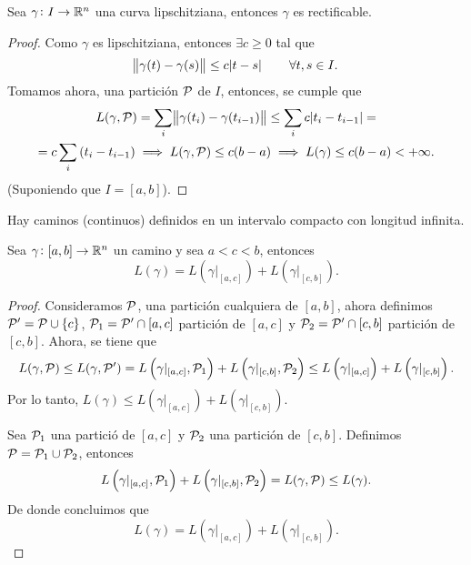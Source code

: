 \begin{prop}
    Sea $\gamma \colon I \to \mathbb{R}^n$ una curva lipschitziana, entonces $\gamma$ es rectificable.
\end{prop}

\begin{proof}
    Como $\gamma$ es lipschitziana, entonces $\exists c \geq 0$ tal que
    \[
        \norm{\gamma(t) - \gamma(s)} \leq c \abs{t - s} \qquad \forall t,s \in I.
    \]
    Tomamos ahora, una partición $\mathcal{P}$ de $I$, entonces, se cumple que
    \begin{gather*}
        L(\gamma, \mathcal{P}) = \sum_i \norm{\gamma(t_i) - \gamma(t_{i-1})} \leq \sum_i c \abs{t_i - t_{i-1}} = \\
        = c \sum_i \left( t_i - t_{i-1} \right) \implies L(\gamma, \mathcal{P}) \leq c (b - a) \implies
        L(\gamma) \leq c(b-a) < +\infty.
    \end{gather*}
    (Suponiendo que $I = [a, b]$).
\end{proof}

\begin{obs}
    Hay caminos (continuos) definidos en un intervalo compacto con longitud infinita.
\end{obs}

\begin{prop}
    Sea $\gamma \colon [a, b] \to \mathbb{R}^n$ un camino y sea $a < c < b$, entonces
    \[
        L(\gamma) = L\left( \gamma\vert_{[a,c]} \right) + L\left( \gamma\vert_{[c,b]} \right).
    \]
\end{prop}

\begin{proof}
    Consideramos $\mathcal{P}$, una partición cualquiera de $[a,b]$, ahora definimos $\mathcal{P}^\prime = \mathcal{P} \cup \{c\}$,
    $\mathcal{P}_1 = \mathcal{P}^\prime \cap [a,c]$ partición de $[a,c]$ y $\mathcal{P}_2 = \mathcal{P}^\prime \cap [c, b]$ partición de $[c, b]$.
    Ahora, se tiene que
    \[
        L(\gamma, \mathcal{P}) \leq L(\gamma, \mathcal{P}^\prime) = L\left( \gamma\vert_{[a,c]}, \mathcal{P}_1 \right) +
        L\left( \gamma\vert_{[c,b]}, \mathcal{P}_2 \right) \leq L\left( \gamma\vert_{[a,c]} \right) +
        L\left( \gamma\vert_{[c,b]} \right).
    \]
    Por lo tanto, $L(\gamma) \leq L\left( \gamma\vert_{[a,c]} \right) + L \left( \gamma\vert_{[c,b]} \right)$.

    Sea $\mathcal{P}_1$ una partició de $[a, c]$ y $\mathcal{P}_2$ una partición de $[c, b]$. Definimos $\mathcal{P} = \mathcal{P}_1 \cup \mathcal{P}_2$,
    entonces
    \[
        L\left( \gamma\vert_{[a,c]}, \mathcal{P}_1 \right) + L\left( \gamma\vert_{[c,b]}, \mathcal{P}_2 \right) = L(\gamma, \mathcal{P}) \leq L(\gamma).
    \]
    De donde concluimos que
    \[
        L(\gamma) = L\left( \gamma\vert_{[a,c]} \right) + L\left( \gamma\vert_{[c,b]} \right).
    \]
\end{proof}

